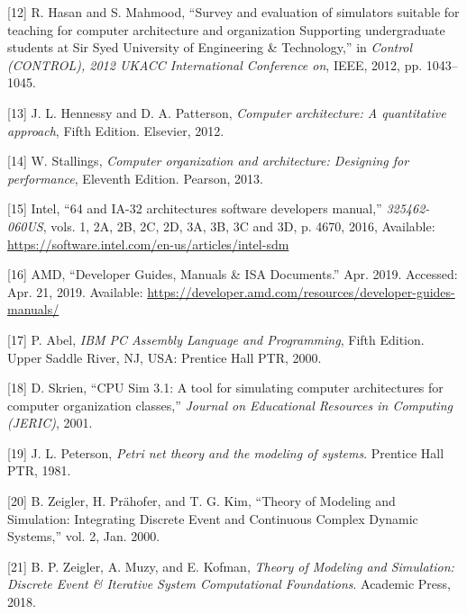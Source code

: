 \documentclass[12pt,twoside]{templates/unerthesis}
\begin{document}
\leavevmode\hypertarget{ref-hasan_survey_2012}{}%
{[}12{]} R. Hasan and S. Mahmood, ``Survey and evaluation of simulators suitable for teaching for computer architecture and organization Supporting undergraduate students at Sir Syed University of Engineering \& Technology,'' in \emph{Control (CONTROL), 2012 UKACC International Conference on}, IEEE, 2012, pp. 1043--1045.

\leavevmode\hypertarget{ref-hennessy_computer_2012}{}%
{[}13{]} J. L. Hennessy and D. A. Patterson, \emph{Computer architecture: A quantitative approach}, Fifth Edition. Elsevier, 2012.

\leavevmode\hypertarget{ref-stallings_computer_2013}{}%
{[}14{]} W. Stallings, \emph{Computer organization and architecture: Designing for performance}, Eleventh Edition. Pearson, 2013.

\leavevmode\hypertarget{ref-intel_64_2016}{}%
{[}15{]} Intel, ``64 and IA-32 architectures software developers manual,'' \emph{325462-060US}, vols. 1, 2A, 2B, 2C, 2D, 3A, 3B, 3C and 3D, p. 4670, 2016, Available: \url{https://software.intel.com/en-us/articles/intel-sdm}

\leavevmode\hypertarget{ref-amd_developer_2019}{}%
{[}16{]} AMD, ``Developer Guides, Manuals \& ISA Documents.'' Apr. 2019. Accessed: Apr. 21, 2019. Available: \url{https://developer.amd.com/resources/developer-guides-manuals/}

\leavevmode\hypertarget{ref-abel_ibm_2000}{}%
{[}17{]} P. Abel, \emph{IBM PC Assembly Language and Programming}, Fifth Edition. Upper Saddle River, NJ, USA: Prentice Hall PTR, 2000.

\leavevmode\hypertarget{ref-skrien_cpu_2001}{}%
{[}18{]} D. Skrien, ``CPU Sim 3.1: A tool for simulating computer architectures for computer organization classes,'' \emph{Journal on Educational Resources in Computing (JERIC)}, 2001.

\leavevmode\hypertarget{ref-peterson_petri_1981}{}%
{[}19{]} J. L. Peterson, \emph{Petri net theory and the modeling of systems}. Prentice Hall PTR, 1981.

\leavevmode\hypertarget{ref-zeigler_theory_2000}{}%
{[}20{]} B. Zeigler, H. Prähofer, and T. G. Kim, ``Theory of Modeling and Simulation: Integrating Discrete Event and Continuous Complex Dynamic Systems,'' vol. 2, Jan. 2000.

\leavevmode\hypertarget{ref-zeigler_theory_2018}{}%
{[}21{]} B. P. Zeigler, A. Muzy, and E. Kofman, \emph{Theory of Modeling and Simulation: Discrete Event \& Iterative System Computational Foundations}. Academic Press, 2018.



\end{document}
